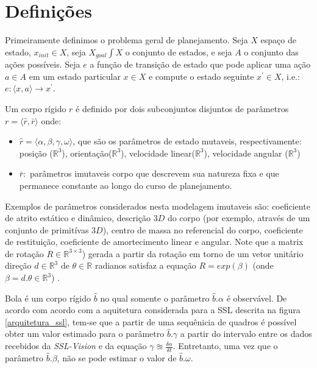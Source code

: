 \section{Definições}

Primeiramente definimos o problema geral de planejamento. Seja $X$
espaço de estado, $x_{init} \in X$, seja $X_{goal}\int X$ o conjunto
de estados, e seja $A$ o conjunto das ações possíveis. Seja $e$ a
função de transição de estado que pode aplicar uma ação $a\in A$ em
um estado particular $x \in X$ e compute o estado seguinte $x^{'}
\in X$, i.e.: $e: \langle x,a \rangle \longrightarrow x^{'}$.

\begin{defi}
  Um corpo rígido $r$ é definido por dois subconjuntos disjuntos
  de parâmetros $r= \langle \hat{r}, \bar{r} \rangle$ onde:
  \begin{itemize}
    \item $\hat{r} = \langle \alpha, \beta, \gamma, \omega \rangle$,
    que são os parâmetros de estado mutaveis, respectivamente:
    posição ($\mathbb{R} ^{3}$), orientação($\mathbb{R} ^{3}$),
    velocidade linear($\mathbb{R} ^{3}$), velocidade angular
    ($\mathbb{R} ^{3}$)
    
    \item $\bar{r} :$ parâmetros imutaveis corpo que descrevem sua
    natureza fixa e que permanece constante ao longo do curso de 
    planejamento.
  \end{itemize}
  
  Exemplos de parâmetros considerados nesta modelagem imutaveis são:
  coeficiente de atrito estático e dinâmico, descrição $3D$ do corpo
  (por exemplo, através de um conjunto de primitívas $3D$), centro de
  massa no referencial do corpo, coeficiente de restituição,
  coeficiente de amortecimento linear e angular. Note que a matrix de
  rotação $R\in\mathbb{R}^{3\times 3}$) gerada a partir da rotação
  em torno de um vetor unitário direção $d\in\mathbb{R}^{3}$  de
  $\theta \in \mathbb{R}$ radianos satisfaz a equação
  $R = exp\left( \beta \right)$ (onde $\beta = d. \theta \in \mathbb{R} ^{3}$)
  \cite{math2robotics}.
\end{defi}

\begin{defi}[Bola]\label{def:bola}
  Bola é um corpo rígido $\hat{b}$ no qual somente o parâmetro
  $\hat{b}.\alpha$ é observável. De acordo com acordo com a
  aquitetura considerada para a SSL descrita na figura
  \ref{arquitetura_ssl}, tem-se que a partir de uma sequênicia
  de quadros é possível obter um valor estimado para o parâmetro
  $\hat{b}.\gamma$ a partir do intervalo entre os dados recebidos
  da \textit{SSL-Vision} e da equação $ \gamma \approxeq 
  \frac{\delta \alpha}{\delta t} $. Entretanto, uma vez que o
  parâmetro $\hat{b}.\beta$, não se pode estimar o valor de
  $\hat{b}.\omega$.
\end{defi}


